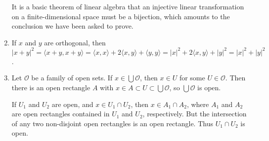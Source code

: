 \documentclass{article}
\begin{document}
\begin{enumerate}[label=\textbf{1-\arabic*.}]
It is a basic theorem of linear algebra that an injective linear transformation on a finite-dimensional space must be a bijection, which amounts to the conclusion we have been asked to prove.
\item If $x$ and $y$ are orthogonal, then $|x+y|^2 = \langle x+y,x+y\rangle = \langle x,x\rangle + 2\langle x,y\rangle + \langle y,y\rangle = |x|^2 + 2\langle x,y\rangle + |y|^2 = |x|^2 + |y|^2$.
\item Let $\mathcal{O}$ be a family of open sets. If $x\in\bigcup \mathcal O$, then $x\in U$ for some $U\in \mathcal O$. Then there is an open rectangle $A$ with $x\in A\subset U \subset \bigcup\mathcal O$, so $\bigcup\mathcal O$ is open.

If $U_1$ and $U_2$ are open, and $x\in U_1\cap U_2$, then $x\in A_1\cap A_2$, where $A_1$ and $A_2$ are open rectangles contained in $U_1$ and $U_2$, respectively. But the intersection of any two non-disjoint open rectangles is an open rectangle. Thus $U_1\cap U_2$ is open.


\end{enumerate}
\end{document}
